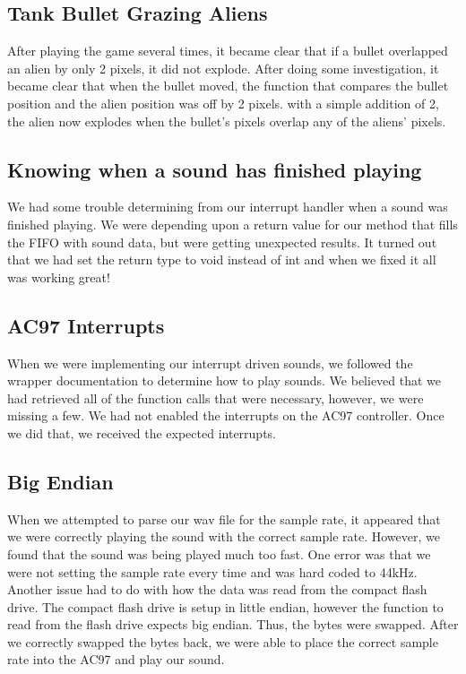 \documentclass[11pt,letter,oneside]{report}
\begin{document}
\subsection{Tank Bullet Grazing Aliens}
After playing the game several times, it became clear that if a bullet overlapped an alien by only 2 pixels, it did not explode. After doing some investigation, it became clear that when the bullet moved, the function that compares the bullet position and the alien position was off by 2 pixels. with a simple addition of 2, the alien now explodes when the bullet's pixels overlap any of the aliens' pixels.

\subsection{Knowing when a sound has finished playing}
We had some trouble determining from our interrupt handler when a sound was finished playing.  We were depending upon a return value for our method that fills the FIFO with sound data, but were getting unexpected results.  It turned out that we had set the return type to void instead of int and when we fixed it all was working great!

\subsection{AC97 Interrupts}
When we were implementing our interrupt driven sounds, we followed the wrapper documentation to determine how to play sounds. We believed that we had retrieved all of the function calls that were necessary, however, we were missing a few. We had not enabled the interrupts on the AC97 controller. Once we did that, we received the expected interrupts.

\subsection{Big Endian}
When we attempted to parse our wav file for the sample rate, it appeared that we were correctly playing the sound with the correct sample rate. However, we found that the sound was being played much too fast. One error was that we were not setting the sample rate every time and was hard coded to 44kHz. Another issue had to do with how the data was read from the compact flash drive. The compact flash drive is setup in little endian, however the function to read from the flash drive expects big endian. Thus, the bytes were swapped. After we correctly swapped the bytes back, we were able to place the correct sample rate into the AC97 and play our sound.
\end{document}
